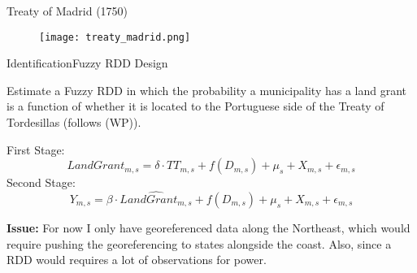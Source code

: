 \documentclass[aspectratio=1610]{beamer}
\begin{document}
\begin{frame}{Treaty of Madrid (1750)}
    \begin{figure}
        \centering
        \texttt{[image: treaty\_madrid.png]}
    \end{figure}
\end{frame}

\begin{frame}{Identification}{Fuzzy RDD Design}
    \begin{outline}
        \1 Estimate a Fuzzy RDD in which the probability a municipality has a land grant is a function of whether it is located to the Portuguese side of the Treaty of Tordesillas (follows \cite{Laudares2022-vy} (WP)). 
        \pause 
        \vspace{2mm}
    \end{outline}
    \vspace{2mm}
    First Stage:
    $$ LandGrant_{m,s} = \delta \cdot TT_{m,s} + f(D_{m,s})+ \mu_s + X_{m,s} + \epsilon_{m,s} $$
    Second Stage:
    $$ Y_{m,s} = \beta \cdot \widehat{LandGrant_{m,s}} + f(D_{m,s})+ \mu_s + X_{m,s} + \epsilon_{m,s}$$
    \pause 
    \begin{outline}
        \1 \textbf{Issue:} For now I only have georeferenced data along the Northeast, which would require pushing the georeferencing to states alongside the coast. Also, since a RDD would requires a lot of observations for power. 
    \end{outline}
\end{frame}


\end{document}
